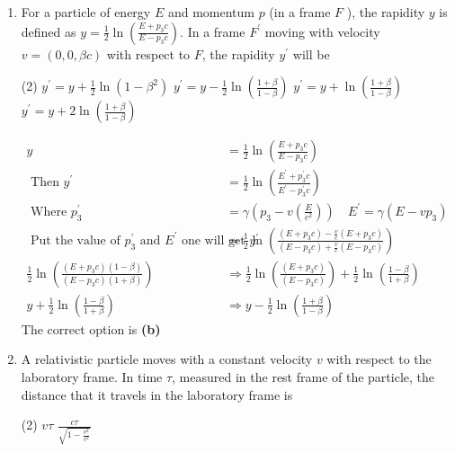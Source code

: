 \begin{enumerate}
	\item For a particle of energy $E$ and momentum $p$ (in a frame $F$ ), the rapidity $y$ is defined as $y=\frac{1}{2} \ln \left(\frac{E+p_{3} c}{E-p_{3} c}\right) .$ In a frame $F^{\prime}$ moving with velocity $v=(0,0, \beta c)$ with respect to $F$, the rapidity $y^{\prime}$ will be
	{}
\begin{tasks}(2)
	\task[\textbf{A.}] $y^{\prime}=y+\frac{1}{2} \ln \left(1-\beta^{2}\right)$
	\task[\textbf{B.}]$y^{\prime}=y-\frac{1}{2} \ln \left(\frac{1+\beta}{1-\beta}\right)$
	\task[\textbf{C.}]$y^{\prime}=y+\ln \left(\frac{1+\beta}{1-\beta}\right)$
	\task[\textbf{D.}]$y^{\prime}=y+2 \ln \left(\frac{1+\beta}{1-\beta}\right)$
\end{tasks}
\begin{answer}
\begin{align*}
y&=\frac{1}{2} \ln \left(\frac{E+p_{3} c}{E-p_{3} c}\right)\\
\text { Then } y^{\prime}&=\frac{1}{2} \ln \left(\frac{E^{\prime}+p_{3}^{\prime} c}{E^{\prime}-p_{3}^{\prime} c}\right)\\
\text { Where } p_{3}^{\prime}&=\gamma\left(p_{3}-v\left(\frac{E}{c^{2}}\right)\right) \quad E^{\prime}=\gamma\left(E-v p_{3}\right)\\
\text { Put the value of } p_{3}^{\prime} \text { and } E^{\prime} \text { one will get } y^{\prime}&=\frac{1}{2} \ln \left(\frac{\left(E+p_{3} c\right)-\frac{v}{c}\left(E+p_{3} c\right)}{\left(E-p_{3} c\right)+\frac{v}{c}\left(E-p_{3} c\right)}\right)\\
\frac{1}{2} \ln \left(\frac{\left(E+p_{3} c\right)(1-\beta)}{\left(E-p_{3} c\right)(1+\beta)}\right) &\Rightarrow \frac{1}{2} \ln \left(\frac{\left(E+p_{3} c\right)}{\left(E-p_{3} c\right)}\right)+\frac{1}{2} \ln \left(\frac{1-\beta}{1+\beta}\right)\\
y+\frac{1}{2} \ln \left(\frac{1-\beta}{1+\beta}\right)& \Rightarrow y-\frac{1}{2} \ln \left(\frac{1+\beta}{1-\beta}\right)
\end{align*}
The correct option is \textbf{(b)}	
\end{answer}
	\item A relativistic particle moves with a constant velocity $v$ with respect to the laboratory frame. In time $\tau$, measured in the rest frame of the particle, the distance that it travels in the laboratory frame is
	{}
\begin{tasks}(2)
	\task[\textbf{A.}] $v \tau$
	\task[\textbf{B.}]$\frac{c \tau}{\sqrt{1-\frac{v^{2}}{c^{2}}}}$

\end{tasks}
\end{enumerate}
